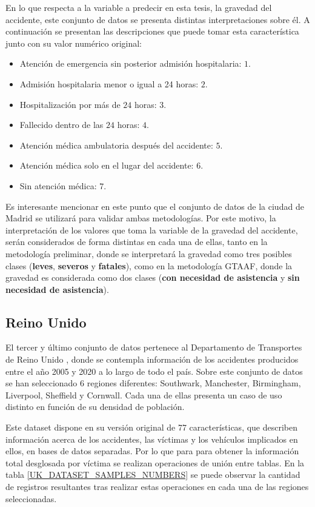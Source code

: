 \documentclass{uathesis-es}
\begin{document}
{	En lo que respecta a la variable a predecir en esta tesis, la gravedad del accidente, este conjunto de datos se presenta distintas interpretaciones sobre él. A continuación se presentan las descripciones que puede tomar esta característica junto con su valor numérico original:
	
	\begin{itemize}
		\item Atención de emergencia sin posterior admisión hospitalaria: $1$.
		\item Admisión hospitalaria menor o igual a 24 horas: $2$.
		\item Hospitalización por más de $24$ horas: $3$.
		\item Fallecido dentro de las $24$ horas: $4$.
		\item Atención médica ambulatoria después del accidente: $5$.
		\item Atención médica solo en el lugar del accidente: $6$.
		\item Sin atención médica: $7$.
	\end{itemize}
	
	Es interesante mencionar en este punto que el conjunto de datos de la ciudad de Madrid se utilizará para validar ambas metodologías. Por este motivo, la interpretación de los valores que toma la variable de la gravedad del accidente, serán considerados de forma distintas en cada una de ellas, tanto en la metodología preliminar, donde se interpretará la gravedad como tres posibles clases (\textbf{leves}, \textbf{severos} y \textbf{fatales}), como en la metodología GTAAF, donde la gravedad es considerada como dos clases (\textbf{con necesidad de asistencia} y \textbf{sin necesidad de asistencia}).
	
	\subsection*{Reino Unido}
	
	El tercer y último conjunto de datos pertenece al Departamento de Transportes de Reino Unido \cite{DatasetUK}, donde se contempla información de los accidentes producidos entre el año 2005 y 2020 a lo largo de todo el país. Sobre este conjunto de datos se han seleccionado 6 regiones diferentes: Southwark, Manchester, Birmingham, Liverpool, Sheffield y Cornwall. Cada una de ellas presenta un caso de uso distinto en función de su densidad de población. 
	
	Este dataset dispone en su versión original de 77 características, que describen información acerca de los accidentes, las víctimas y los vehículos implicados en ellos, en bases de datos separadas. Por lo que para para obtener la información total desglosada por víctima se realizan operaciones de unión entre tablas.  En la tabla \ref{UK_DATASET_SAMPLES_NUMBERS} se puede observar la cantidad de registros resultantes tras realizar estas operaciones en cada una de las regiones seleccionadas.
	
}
\end{document}
